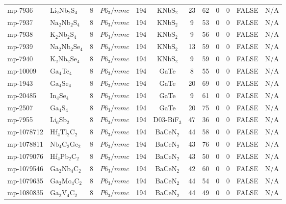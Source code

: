 {\begin{longtable}{llcccccccccc}
    mp-7936 & Li$_{2}$Nb$_{2}$S$_{4}$ & 8     & $P6_3/mmc$ & 194   & KNbS$_{2}$ & 23    & 62    & 0     & 0     & FALSE & N/A \\
    mp-7937 & Na$_{2}$Nb$_{2}$S$_{4}$ & 8     & $P6_3/mmc$ & 194   & KNbS$_{2}$ & 9     & 53    & 0     & 0     & FALSE & N/A \\
    mp-7938 & K$_{2}$Nb$_{2}$S$_{4}$ & 8     & $P6_3/mmc$ & 194   & KNbS$_{2}$ & 9     & 56    & 0     & 0     & FALSE & N/A \\
    mp-7939 & Na$_{2}$Nb$_{2}$Se$_{4}$ & 8     & $P6_3/mmc$ & 194   & KNbS$_{2}$ & 13    & 59    & 0     & 0     & FALSE & N/A \\
    mp-7940 & K$_{2}$Nb$_{2}$Se$_{4}$ & 8     & $P6_3/mmc$ & 194   & KNbS$_{2}$ & 9     & 59    & 0     & 0     & FALSE & N/A \\
    mp-10009 & Ga$_{4}$Te$_{4}$ & 8     & $P6_3/mmc$ & 194   & GaTe  & 8     & 55    & 0     & 0     & FALSE & N/A \\
    mp-1943 & Ga$_{4}$Se$_{4}$ & 8     & $P6_3/mmc$ & 194   & GaTe  & 20    & 69    & 0     & 0     & FALSE & N/A \\
    mp-20485 & In$_{4}$Se$_{4}$ & 8     & $P6_3/mmc$ & 194   & GaTe  & 9     & 61    & 0     & 0     & FALSE & N/A \\
    mp-2507 & Ga$_{4}$S$_{4}$ & 8     & $P6_3/mmc$ & 194   & GaTe  & 20    & 75    & 0     & 0     & FALSE & N/A \\
    mp-7955 & Li$_{6}$Sb$_{2}$ & 8     & $P6_3/mmc$ & 194   & D03-BiF$_{3}$ & 47    & 36    & 0     & 0     & FALSE & N/A \\
    mp-1078712 & Hf$_{4}$Tl$_{2}$C$_{2}$ & 8     & $P6_3/mmc$ & 194   & BaCeN$_{2}$ & 44    & 58    & 0     & 0     & FALSE & N/A \\
    mp-1078811 & Nb$_{4}$C$_{2}$Ge$_{2}$ & 8     & $P6_3/mmc$ & 194   & BaCeN$_{2}$ & 43    & 76    & 0     & 0     & FALSE & N/A \\
    mp-1079076 & Hf$_{4}$Pb$_{2}$C$_{2}$ & 8     & $P6_3/mmc$ & 194   & BaCeN$_{2}$ & 43    & 50    & 0     & 0     & FALSE & N/A \\
    mp-1079546 & Ga$_{2}$Nb$_{4}$C$_{2}$ & 8     & $P6_3/mmc$ & 194   & BaCeN$_{2}$ & 42    & 60    & 0     & 0     & FALSE & N/A \\
    mp-1079635 & Ga$_{2}$Mo$_{4}$C$_{2}$ & 8     & $P6_3/mmc$ & 194   & BaCeN$_{2}$ & 44    & 54    & 0     & 0     & FALSE & N/A \\
    mp-1080835 & Ga$_{2}$V$_{4}$C$_{2}$ & 8     & $P6_3/mmc$ & 194   & BaCeN$_{2}$ & 44    & 49    & 0     & 0     & FALSE & N/A \\

\end{longtable}}
